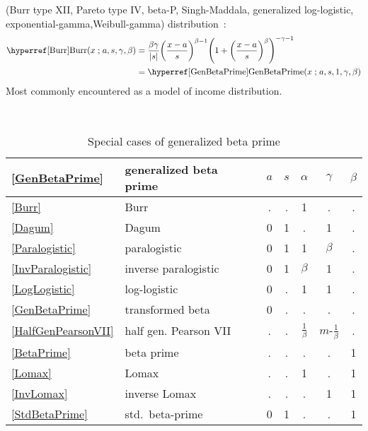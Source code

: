   (Burr type XII, Pareto type IV, beta-P, Singh-Maddala, generalized log-logistic, exponential-gamma,Weibull-gamma) 
distribution~\cite{Burr1942,Tadikamalla1980, Kleiber2003}:
\begin{align}
\label{Burr}
\opr{Burr}(x\given a, s, \gamma,\beta) 
&=  
 \frac{\beta \gamma}{|s|} \Left(\frac{x-a}{s}\Right)^{\beta-1}  \Left(1+\Left(\frac{x-a}{s}\Right)^\beta\Right)^{-\gamma-1} 
 \checked
\\ & = \opr{GenBetaPrime}(x\given a, s, 1,\gamma,\beta) \notag   \checked
\end{align}
Most commonly encountered as a model of income distribution.



\begin{table*}[tp]
\begin{center}
\caption[Generalized beta prime distribution -- Special cases]{Special cases of generalized beta prime}
\label{GenBetaPrimeTable}
~\\
{\renewcommand{\arraystretch}{1.25} 
\begin{tabular}{llccccc}
\eqref{GenBetaPrime}  & generalized beta prime & $a$ & $s$ & $\alpha$  &  $\gamma$ & ${\beta}$  \\
\hline
\eqref{Burr} & Burr 	        			&  .  &  .  &  1  &  .    &    .     \\
\eqref{Dagum} & Dagum			&  0  &  1 &  .  &  1   &    .     \\
\eqref{Paralogistic} & paralogistic			&  0 &  1  &  1  &  $\beta$    &    .     \\
\eqref{InvParalogistic} & inverse paralogistic	&  0 &  1  &   $\beta$& 1    &    .     \\
\eqref{LogLogistic} & log-logistic			&  0  &  . &  1  &  1  &    .     \\
\eqref{GenBetaPrime} & transformed beta			&  0  &  . &  .  &  .  &    .     \\
\eqref{HalfGenPearsonVII} & half gen. Pearson VII 		&  .  &  . &  $\tfrac{1}{\beta}$  &  $m$-$\tfrac{1}{\beta}$  &    .     \\
\eqref{BetaPrime} & beta prime		& . & . & . & . & 1  \\
\eqref{Lomax} & Lomax 				&  .  &  . &  1  &  .   &    1     \\
\eqref{InvLomax} & inverse Lomax 				&  .  &  . &  .  &  1   &    1     \\
\eqref{StdBetaPrime} & std.~beta-prime		& 0 & 1 & . & . & 1  \\

\end{tabular}}
\end{center}
\end{table*}
